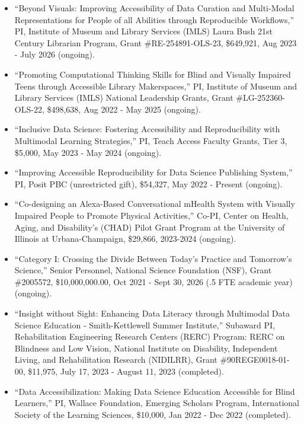 \documentclass[11pt,a4paper,]{awesome-cv}
\begin{document}
\begin{itemize}
\item
  ``Beyond Visuals: Improving Accessibility of Data Curation and
  Multi-Modal Representations for People of all Abilities through
  Reproducible Workflows,'' PI, Institute of Museum and Library Services
  (IMLS) Laura Bush 21st Century Librarian Program, Grant
  \#RE-254891-OLS-23, \$649,921, Aug 2023 - July 2026 (ongoing).
\item
  ``Promoting Computational Thinking Skills for Blind and Visually
  Impaired Teens through Accessible Library Makerspaces,'' PI, Institute
  of Museum and Library Services (IMLS) National Leadership Grants,
  Grant \#LG-252360-OLS-22, \$498,638, Aug 2022 - May 2025 (ongoing).
\item
  ``Inclusive Data Science: Fostering Accessibility and Reproducibility
  with Multimodal Learning Strategies,'' PI, Teach Access Faculty
  Grants, Tier 3, \$5,000, May 2023 - May 2024 (ongoing).
\item
  ``Improving Accessible Reproducibility for Data Science Publishing
  System,'' PI, Posit PBC (unrestricted gift), \$54,327, May 2022 -
  Present (ongoing).
\item
  ``Co-designing an Alexa-Based Conversational mHealth System with
  Visually Impaired People to Promote Physical Activities,'' Co-PI,
  Center on Health, Aging, and Disability's (CHAD) Pilot Grant Program
  at the University of Illinois at Urbana-Champaign, \$29,866, 2023-2024
  (ongoing).
\item
  ``Category I: Crossing the Divide Between Today's Practice and
  Tomorrow's Science,'' Senior Personnel, National Science Foundation
  (NSF), Grant \#2005572, \$10,000,000.00, Oct 2021 - Sept 30, 2026 (.5
  FTE academic year) (ongoing).
\item
  ``Insight without Sight: Enhancing Data Literacy through Multimodal
  Data Science Education - Smith-Kettlewell Summer Institute,'' Subaward
  PI, Rehabilitation Engineering Research Centers (RERC) Program: RERC
  on Blindness and Low Vision, National Institute on Disability,
  Independent Living, and Rehabilitation Research (NIDILRR), Grant
  \#90REGE0018-01-00, \$11,975, July 17, 2023 - August 11, 2023
  (completed).
\item
  ``Data Accessibilization: Making Data Science Education Accessible for
  Blind Learners,'' PI, Wallace Foundation, Emerging Scholars Program,
  International Society of the Learning Sciences, \$10,000, Jan 2022 -
  Dec 2022 (completed).
\end{itemize}
\end{document}
